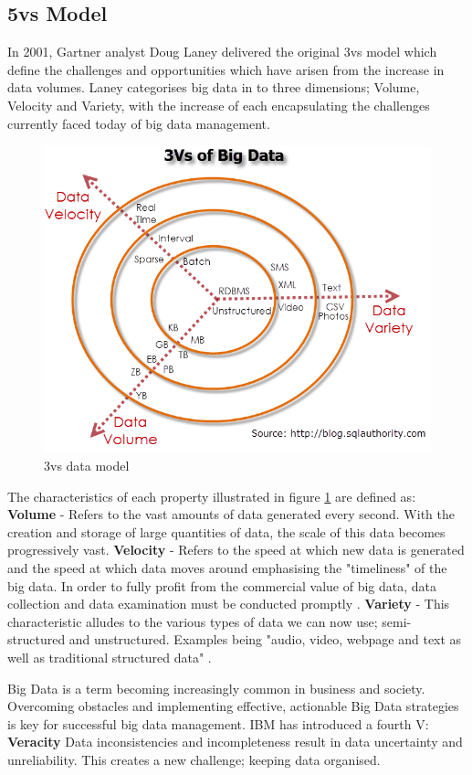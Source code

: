 \subsection{5vs Model}
In 2001, Gartner analyst Doug Laney delivered the original 3vs model which define the challenges and opportunities which have arisen from the increase in data volumes. Laney categorises big data in to three dimensions; Volume, Velocity and Variety, with the increase of each encapsulating the challenges currently faced today of big data management. \begin{figure}[h]\begin{center}\includegraphics[width=0.8\linewidth]{images/3vs}\caption{3vs data model}\label{fig:3vs}\end{center}\end{figure}The characteristics of each property illustrated in figure \ref{fig:3vs} are defined as: \textbf{Volume} - Refers to the vast amounts of data generated every second. With the creation and storage of large quantities of data, the scale of this data becomes progressively vast. \textbf{Velocity} - Refers to the speed at which new data is generated and the speed at which data moves around emphasising the "timeliness" of the big data. In order to fully profit from the commercial value of big data, data collection and data examination must be conducted promptly . \textbf{Variety} - This characteristic alludes to the various types of data we can now use; semi-structured and unstructured. Examples being "audio, video, webpage and text as well as traditional structured data" \cite{bigdata}.

Big Data is a term becoming increasingly common in business and society. Overcoming obstacles and implementing effective, actionable Big Data strategies is key for successful big data management. IBM has introduced a fourth V: \textbf{Veracity} Data inconsistencies and incompleteness result in data uncertainty and unreliability. This creates a new challenge; keeping data organised. \cite{bigdata}

